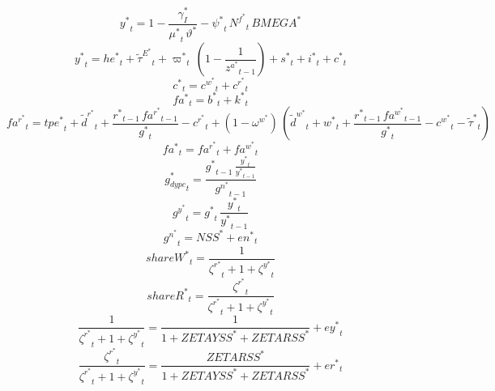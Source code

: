 \begin{dmath}
{{y^*}}_{t}=1-\frac{{{\gamma_I^*}}}{{{\mu^*}}_{t}\, {{\vartheta^*}}}-{{\psi^*}}_{t}\, {{N^f^*}}_{t}\, {{BMEGA^*}}
\end{dmath}
\begin{dmath}
{{y^*}}_{t}={{he^*}}_{t}+{\tilde{\tau}^E^*}_{t}+{{\varpi^*}}_{t}\, \left(1-\frac{1}{{{z^a^*}}_{t-1}}\right)+{{s^*}}_{t}+{{i^*}}_{t}+{{c^*}}_{t}
\end{dmath}
\begin{dmath}
{{c^*}}_{t}={{c^w^*}}_{t}+{{c^r^*}}_{t}
\end{dmath}
\begin{dmath}
{{fa^*}}_{t}={{b^*}}_{t}+{{k^*}}_{t}
\end{dmath}
\begin{dmath}
{{fa^r^*}}_{t}={{tpe^*}}_{t}+{\tilde{d}^r^*}_{t}+\frac{{{r^*}}_{t-1}\, {{fa^r^*}}_{t-1}}{{{g^*}}_{t}}-{{c^r^*}}_{t}+\left(1-{{\omega^w^*}}\right)\, \left({\tilde{d}^w^*}_{t}+{{w^*}}_{t}+\frac{{{r^*}}_{t-1}\, {{fa^w^*}}_{t-1}}{{{g^*}}_{t}}-{{c^w^*}}_{t}-{\tilde{\tau}^*}_{t}\right)
\end{dmath}
\begin{dmath}
{{fa^*}}_{t}={{fa^r^*}}_{t}+{{fa^w^*}}_{t}
\end{dmath}
\begin{dmath}
{{g_{dypc}^*}}_{t}=\frac{{{g^*}}_{t-1}\, \frac{{{y^*}}_{t}}{{{y^*}}_{t-1}}}{{{g^n^*}}_{t-1}}
\end{dmath}
\begin{dmath}
{{g^y^*}}_{t}={{g^*}}_{t}\, \frac{{{y^*}}_{t}}{{{y^*}}_{t-1}}
\end{dmath}
\begin{dmath}
{{g^n^*}}_{t}={{NSS^*}}+{{en^*}}_{t}
\end{dmath}
\begin{dmath}
{{shareW^*}}_{t}=\frac{1}{{{\zeta^r^*}}_{t}+1+{{\zeta^y^*}}_{t}}
\end{dmath}
\begin{dmath}
{{shareR^*}}_{t}=\frac{{{\zeta^r^*}}_{t}}{{{\zeta^r^*}}_{t}+1+{{\zeta^y^*}}_{t}}
\end{dmath}
\begin{dmath}
\frac{1}{{{\zeta^r^*}}_{t}+1+{{\zeta^y^*}}_{t}}=\frac{1}{1+{{ZETAYSS^*}}+{{ZETARSS^*}}}+{{ey^*}}_{t}
\end{dmath}
\begin{dmath}
\frac{{{\zeta^r^*}}_{t}}{{{\zeta^r^*}}_{t}+1+{{\zeta^y^*}}_{t}}=\frac{{{ZETARSS^*}}}{1+{{ZETAYSS^*}}+{{ZETARSS^*}}}+{{er^*}}_{t}
\end{dmath}
